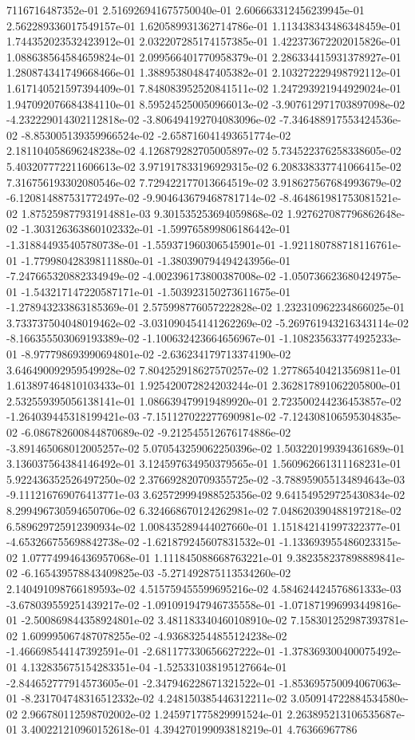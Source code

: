 7116716487352e-01	2.516926941675750040e-01	2.606663312456239945e-01	2.562289336017549157e-01	1.620589931362714786e-01	1.113438343486348459e-01	1.744352023532423912e-01	2.032207285174157385e-01	1.422373672202015826e-01	1.088638564584659824e-01	2.099566401770958379e-01	2.286334415931378927e-01	1.280874341749668466e-01	1.388953804847405382e-01	2.103272229498792112e-01	1.617140521597394409e-01	7.848083952520841511e-02	1.247293921944929024e-01	1.947092076684384110e-01	8.595245250050966013e-02	-3.907612971703897098e-02	-4.232229014302112818e-02	-3.806494192704083096e-02	-7.346488917553424536e-02	-8.853005139359966524e-02	-2.658716041493651774e-02	2.181104058696248238e-02	4.126879282705005897e-02	5.734522376258338605e-02	5.403207772211606613e-02	3.971917833196929315e-02	6.208338337741066415e-02	7.316756193302080546e-02	7.729422177013664519e-02	3.918627567684993679e-02	-6.120814887531772497e-02	-9.904643679468781714e-02	-8.464861981753081521e-02	1.875259877931914881e-03	9.301535253694059868e-02	1.927627087796862648e-02	-1.303126363860102332e-01	-1.599765899806186442e-01	-1.318844935405780738e-01	-1.559371960306545901e-01	-1.921180788718116761e-01	-1.779980428398111880e-01	-1.380390794494243956e-01	-7.247665320882334949e-02	-4.002396173800387008e-02	-1.050736623680424975e-01	-1.543217147220587171e-01	-1.503923150273611675e-01	-1.278943233863185369e-01	2.575998776057222828e-02	1.232310962234866025e-01	3.733737504048019462e-02	-3.031090454141262269e-02	-5.269761943216343114e-02	-8.166355503069193389e-02	-1.100632423664656967e-01	-1.108235633774925233e-01	-8.977798693990694801e-02	-2.636234179713374190e-02	3.646490092959549928e-02	7.804252918627570257e-02	1.277865404213569811e-01	1.613897464810103433e-01	1.925420072824203244e-01	2.362817891062205800e-01	2.532559395056138141e-01	1.086639479919489920e-01	2.723500244236453857e-02	-1.264039445318199421e-03	-7.151127022277690981e-02	-7.124308106595304835e-02	-6.086782600844870689e-02	-9.212545512676174886e-02	-3.891465068012005257e-02	5.070543259062250396e-02	1.503220199394361689e-01	3.136037564384146492e-01	3.124597634950379565e-01	1.560962661311168231e-01	5.922436352526497250e-02	2.376692820709355725e-02	-3.788959055134894643e-03	-9.111216769076413771e-03	3.625729994988525356e-02	9.641549529725430834e-02	8.299496730594650706e-02	6.324668670124262981e-02	7.048620390488197218e-02	6.589629725912390934e-02	1.008435289444027660e-01	1.151842141997322377e-01	-4.653266755698842738e-02	-1.621879245607831532e-01	-1.133693955486023315e-02	1.077749946436957068e-01	1.111845088668763221e-01	9.382358237898889841e-02	-6.165439578843409825e-03	-5.271492875113534260e-02	2.140491098766189593e-02	4.515759455599695216e-02	4.584624424576861333e-03	-3.678039559251439217e-02	-1.091091947946735558e-01	-1.071871996993449816e-01	-2.500869844358924801e-02	3.481183340460108910e-02	7.158301252987393781e-02	1.609995067487078255e-02	-4.936832544855124238e-02	-1.466698544147392591e-01	-2.681177330656627222e-01	-1.378369300400075492e-01	4.132835675154283351e-04	-1.525331038195127664e-01	-2.844652777914573605e-01	-2.347946228671321522e-01	-1.853695750094067063e-01	-8.231704748316512332e-02	4.248150385446312211e-02	3.050914722884534580e-02	2.966780112598702002e-02	1.245971775829991524e-01	2.263895213106535687e-01	3.400221210960152618e-01	4.394270199093818219e-01	4.76366967786